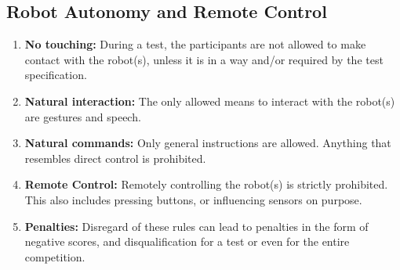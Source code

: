 \subsection{Robot Autonomy and Remote Control}
\begin{enumerate}
	\item \textbf{No touching:} During a test, the participants are not allowed to make contact with the robot(s), unless it is in a  way and/or required by the test specification. 
	\item \textbf{Natural interaction:} The only allowed means to interact with the robot(s) are gestures and speech.
	\item \textbf{Natural commands:} Only general instructions are allowed. 
	Anything that resembles direct control is prohibited.
	\item \textbf{Remote Control:} Remotely controlling the robot(s) is strictly prohibited. This also includes pressing buttons, or influencing sensors on purpose.
	\item \textbf{Penalties:} Disregard of these rules can lead to penalties in the form of negative scores, and disqualification for a test or even for the entire competition. 
\end{enumerate}

